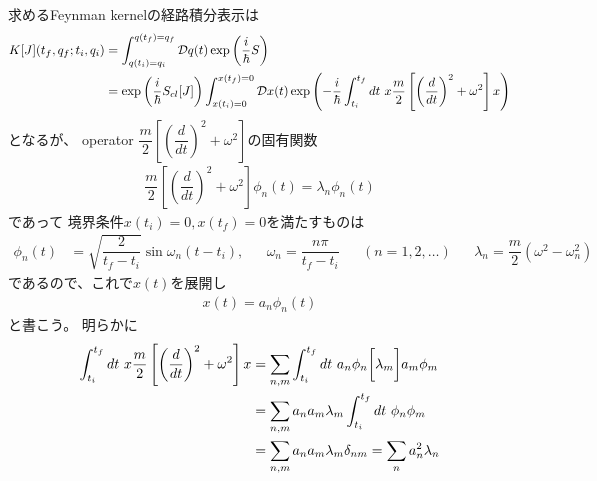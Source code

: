 求めるFeynman kernelの経路積分表示は
\begin{align}
    K[J]( t_f, q_f ; t_i, q_i )
    &=
    \int_{q(t_i) = q_i}^{q(t_f) = q_f}
        \mathcal{D} q(t)
    \exp\left(
        \dfrac{i}{\hbar} S
    \right)
\notag\\&=
    \exp\left(
        \dfrac{i}{\hbar} S_{cl} [J]
    \right)
    \int_{x(t_i) = 0}^{x(t_f) = 0}
        \mathcal{D} x(t)
    \exp\left(
        -
        \dfrac{ i }{\hbar}
        \int_{t_i}^{t_f} dt\ 
        x
        \dfrac{ m }{2}
        \left[
            \left(
                \dfrac{d}{dt}
            \right)^2
            +
            \omega^2
        \right]
        x
    \right)
\label{harmonic oscillator action operator matrix}
\end{align}
となるが、
operator $
    \dfrac{ m }{2}
    \left[
    \left(
        \dfrac{d}{dt}
    \right)^2
+
    \omega^2
    \right]
$の固有関数
\begin{align}
    \dfrac{ m }{2}
    \left[
        \left(
            \dfrac{d}{dt}
        \right)^2
        +
        \omega^2
    \right]
    \phi_n(t)
    =
    \lambda_n
    \phi_n(t)
\end{align}
であって
境界条件$x(t_i) = 0, x(t_f) = 0$を満たすものは
\begin{align}
    \phi_n(t)
    &=
    \sqrt{ 
        \dfrac{
            2
        }{
            t_f - t_i
        }
    }
    \sin \omega_n (t - t_i)
    ,
    &&
    \omega_n
    =
    \dfrac{n \pi}{t_f - t_i}
    &&
    (n = 1, 2, \dots)
    &&
    \lambda_n
    =
    \dfrac{ m }{2}
    (
        \omega^2
    -
        \omega_n^2
    )
\end{align}
であるので、これで$x(t)$を展開し
\begin{align}
    x(t)
    =
    a_n
    \phi_n(t)
\end{align}
と書こう。
明らかに
\begin{align}
    \int_{t_i}^{t_f} dt\ 
    x
    \dfrac{ m }{2}
    \left[
        \left(
            \dfrac{d}{dt}
        \right)^2
        +
        \omega^2
    \right]
    x
    &=
    \sum_{n,m}
    \int_{t_i}^{t_f} dt\ 
    a_n \phi_n
    \bigg[
        \lambda_m
    \bigg]
    a_m \phi_m
\notag\\&=
    \sum_{n,m}
        a_n a_m
        \lambda_m
    \int_{t_i}^{t_f} dt\ 
    \phi_n
    \phi_m
\notag\\&=
    \sum_{n,m}
        a_n a_m
        \lambda_m
    \delta_{nm}
    =
    \sum_{n}
    a_n^2
    \lambda_n
\end{align}
